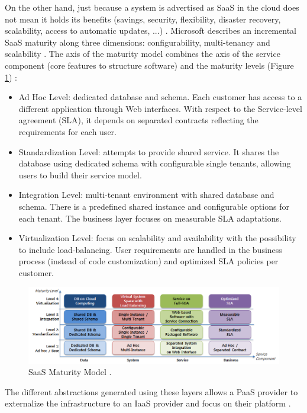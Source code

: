 \documentclass[12pt,english]{article} %
\begin{document}
On the other hand, just because a system is advertised as SaaS in the cloud does not mean it holds its benefits (savings, security, flexibility, disaster recovery, scalability, access to automatic updates, ...) \cite{saas-maturity-model}.
Microsoft describes an incremental SaaS maturity along three dimensions: configurability, multi-tenancy and scalability \cite{saas-maturity-model}. 
The axis of the maturity model combines the axis of the service component (core features to structure software) and the maturity levels (Figure \ref{fig:saas-maturity-model}) \cite{cloud-computing-state-of-the-art}:
\begin{itemize}
    \item Ad Hoc Level: dedicated database and schema. Each customer has access to a different application through Web interfaces. With respect to the Service-level agreement (SLA), it depends on separated contracts reflecting the requirements for each user.
    \item Standardization Level: attempts to provide shared service. It shares the database using dedicated schema with configurable single tenants, allowing users to build their service model.
    \item Integration Level: multi-tenant environment with shared database and schema. There is a predefined shared instance and configurable options for each tenant. The business layer focuses on measurable SLA adaptations.
    \item Virtualization Level: focus on scalability and availability with the possibility to include load-balancing.
    User requirements are handled in the business process (instead of code customization) and optimized SLA policies per customer.
\end{itemize} 

\begin{figure}[H]
  \centering
  \includegraphics[scale=0.5]{img/cloud/saas-maturity-model.png}
  \caption{SaaS Maturity Model \cite{saas-maturity-model}.}
  \label{fig:saas-maturity-model}
\end{figure}

The different abstractions generated using these layers allows a PaaS provider to externalize the infrastructure to an IaaS provider and focus on their platform \cite{cloud-computing-state-of-the-art}.
\end{document}

